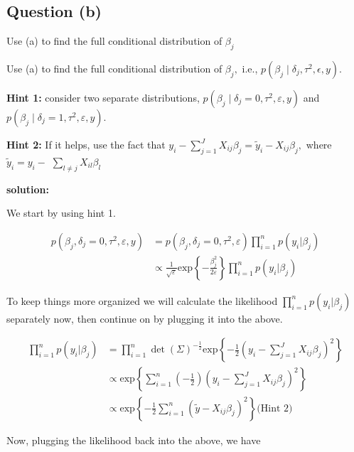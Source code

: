 \documentclass[
]{article}
\begin{document}
\hypertarget{question-b}{%
\subsection{Question (b)}\label{question-b}}

Use (a) to find the full conditional distribution of \(\beta_j\)

Use (a) to find the full conditional distribution of \(\beta_{j},\)
i.e.,
\(p\left(\beta_{j} \mid \delta_{j}, \tau^{2}, \epsilon, y\right)\).

\textbf{Hint 1:} consider two separate distributions,
\(p\left(\beta_{j} \mid \delta_{j}=0, \tau^{2}, \varepsilon, y\right)\)
and
\(p\left(\beta_{j} \mid \delta_{j}=1, \tau^{2}, \varepsilon, y\right)\).

\textbf{Hint 2:} If it helps, use the fact that
\(y_{i}-\sum_{j=1}^{J} X_{i j} \beta_{j}=\tilde{y}_{i}-X_{i j} \beta_{j},\)
where \(\tilde{y}_{i}=y_{i}-\) \(\sum_{l \neq j} X_{i l} \beta_{l}\)

\textbf{solution:}

We start by using hint 1.

\begin{align*}
p(\beta_j, \delta_j=0, \tau^2, \varepsilon, y) &= p(\beta_j, \delta_j=0, \tau^2, \varepsilon)\prod_{i=1}^n p(y_i | \beta_j) \\
   &\propto \frac{1}{\sqrt{\varepsilon}}\text{exp}\left\{-\frac{\beta_j^2}{2\varepsilon} \right\}\prod_{i=1}^n p(y_i | \beta_j)
\end{align*}

To keep things more organized we will calculate the likelihood
\(\prod_{i=1}^n p(y_i | \beta_j)\) separately now, then continue on by
plugging it into the above.

\begin{align*}
\prod_{i=1}^n p(y_i | \beta_j) &= \prod_{i=1}^n\det(\Sigma)^{-\frac{1}{2}} \text{exp}\left\{-\frac{1}{2}\left(y_i - \sum_{j=1}^JX_{ij}\beta_j \right)^2 \right\} \\
    &\propto    \text{exp}\left\{\sum_{i=1}^n \left(-\frac{1}{2} \right) \left(y_i - \sum_{j=1}^JX_{ij}\beta_j \right)^2 \right\} \\
    &\propto    \text{exp}\left\{-\frac{1}{2}\sum_{i=1}^n \left(\tilde{y} - X_{ij}\beta_j \right)^2 \right\} \text{(Hint 2)}
\end{align*}

Now, plugging the likelihood back into the above, we have
\end{document}
